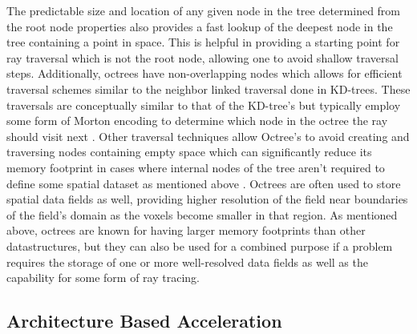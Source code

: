 \documentclass[12pt, a4paper]{article}
\begin{document}
The predictable size and location of any given node in the tree determined from the root node properties also provides a fast lookup of the deepest node in the tree containing a point in space. This is helpful in providing a starting point for ray traversal which is not the root node, allowing one to avoid shallow traversal steps. Additionally, octrees have non-overlapping nodes which allows for efficient traversal schemes similar to the neighbor linked traversal done in KD-trees. These traversals are conceptually similar to that of the KD-tree's but typically employ some form of Morton encoding to determine which node in the octree the ray should visit next \cite{parametric_octree_revelles_2000}. Other traversal techniques allow Octree's to avoid creating and traversing nodes containing empty space which can significantly reduce its memory footprint in cases where internal nodes of the tree aren't required to define some spatial dataset as mentioned above \cite{SAMET1989445}. Octrees are often used to store spatial data fields as well, providing higher resolution of the field near boundaries of the field's domain as the voxels become smaller in that region. As mentioned above, octrees are known for having larger memory footprints than other datastructures, but they can also be used for a combined purpose if a problem requires the storage of one or more well-resolved data fields as well as the capability for some form of ray tracing.


\subsection{Architecture Based Acceleration}%
\end{document}
